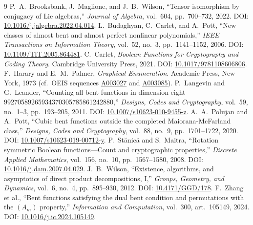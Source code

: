 \documentclass[11pt,a4paper]{article}
\theoremstyle{definition}
\theoremstyle{remark}
\begin{document}
\vspace{8pt}
\begin{thebibliography}{9}
\small
{} P.~A.~Brooksbank, J.~Maglione, and J.~B.~Wilson, ``Tensor isomorphism by conjugacy of Lie algebras,'' \emph{Journal of Algebra}, vol.~604, pp.~700--732, 2022. DOI: \href{https://doi.org/10.1016/j.jalgebra.2022.04.014}{10.1016/j.jalgebra.2022.04.014}.
 L.~Budaghyan, C.~Carlet, and A.~Pott, ``New classes of almost bent and almost perfect nonlinear polynomials,'' \emph{IEEE Transactions on Information Theory}, vol.~52, no.~3, pp.~1141--1152, 2006. DOI: \href{https://doi.org/10.1109/TIT.2005.864481}{10.1109/TIT.2005.864481}.
 C.~Carlet, \emph{Boolean Functions for Cryptography and Coding Theory}. Cambridge University Press, 2021. DOI: \href{https://doi.org/10.1017/9781108606806}{10.1017/9781108606806}.
 F.~Harary and E.~M.~Palmer, \emph{Graphical Enumeration}. Academic Press, New York, 1973 (cf.\ OEIS sequences \href{https://oeis.org/A003027}{A003027} and \href{https://oeis.org/A003085}{A003085}).
 P.~Langevin and G.~Leander, ``Counting all bent functions in dimension eight 99270589265934370305785861242880,'' \emph{Designs, Codes and Cryptography}, vol.~59, no.~1--3, pp.~193--205, 2011. DOI: \href{https://doi.org/10.1007/s10623-010-9455-z}{10.1007/s10623-010-9455-z}.
 A.~A.~Polujan and A.~Pott, ``Cubic bent functions outside the completed Maiorana-McFarland class,'' \emph{Designs, Codes and Cryptography}, vol.~88, no.~9, pp.~1701--1722, 2020. DOI: \href{https://doi.org/10.1007/s10623-019-00712-y}{10.1007/s10623-019-00712-y}.
 P.~St\u{a}nic\u{a} and S.~Maitra, ``Rotation symmetric Boolean functions---Count and cryptographic properties,'' \emph{Discrete Applied Mathematics}, vol.~156, no.~10, pp.~1567--1580, 2008. DOI: \href{https://doi.org/10.1016/j.dam.2007.04.029}{10.1016/j.dam.2007.04.029}.
 J.~B.~Wilson, ``Existence, algorithms, and asymptotics of direct product decompositions, I,'' \emph{Groups, Geometry, and Dynamics}, vol.~6, no.~4, pp.~895--930, 2012. DOI: \href{https://doi.org/10.4171/GGD/178}{10.4171/GGD/178}.
 F.~Zhang et al., ``Bent functions satisfying the dual bent condition and permutations with the $(A_m)$ property,'' \emph{Information and Computation}, vol.~300, art.~105149, 2024. DOI: \href{https://doi.org/10.1016/j.ic.2024.105149}{10.1016/j.ic.2024.105149}.
\end{thebibliography}
\end{document}
